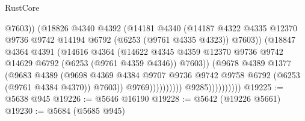 \begin{lexlean}{RustCore}
\begin{coremodule}
                                          @7603))
                                      (@18826
                                        @4340
                                        @4392
                                        (@14181
                                          @4340
                                          (@14187
                                            @4322
                                            @4335
                                            @12370
                                            @9736
                                            @9742
                                            @14194
                                            @6792
                                            (@6253 (@9761 @4335 @4323))
                                            @7603))
                                        (@18847
                                          @4364
                                          @4391
                                          (@14616
                                            @4364
                                            (@14622
                                              @4345
                                              @4359
                                              @12370
                                              @9736
                                              @9742
                                              @14629
                                              @6792
                                              (@6253 (@9761 @4359 @4346))
                                              @7603))
                                          (@9678
                                            @4389
                                            @1377
                                            (@9683
                                              @4389
                                              (@9698
                                                @4369
                                                @4384
                                                @9707
                                                @9736
                                                @9742
                                                @9758
                                                @6792
                                                (@6253 (@9761 @4384 @4370))
                                                @7603))
                                            @9769))))))))))
                        @9285))))))))))
@19225 := @5638 @945
@19226 := @5646 @16190
@19228 := @5642 (@19226 @5661)
@19230 := @5684 (@5685 @945)

\end{coremodule}
\end{lexlean}
